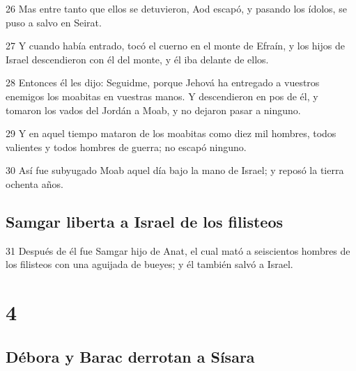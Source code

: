 \par 26 Mas entre tanto que ellos se detuvieron, Aod escapó, y pasando los ídolos, se puso a salvo en Seirat.
\par 27 Y cuando había entrado, tocó el cuerno en el monte de Efraín, y los hijos de Israel descendieron con él del monte, y él iba delante de ellos.
\par 28 Entonces él les dijo: Seguidme, porque Jehová ha entregado a vuestros enemigos los moabitas en vuestras manos. Y descendieron en pos de él, y tomaron los vados del Jordán a Moab, y no dejaron pasar a ninguno.
\par 29 Y en aquel tiempo mataron de los moabitas como diez mil hombres, todos valientes y todos hombres de guerra; no escapó ninguno.
\par 30 Así fue subyugado Moab aquel día bajo la mano de Israel; y reposó la tierra ochenta años.

\section*{Samgar liberta a Israel de los filisteos}

\par 31 Después de él fue Samgar hijo de Anat, el cual mató a seiscientos hombres de los filisteos con una aguijada de bueyes; y él también salvó a Israel.

\chapter{4}

\section*{Débora y Barac derrotan a Sísara}

